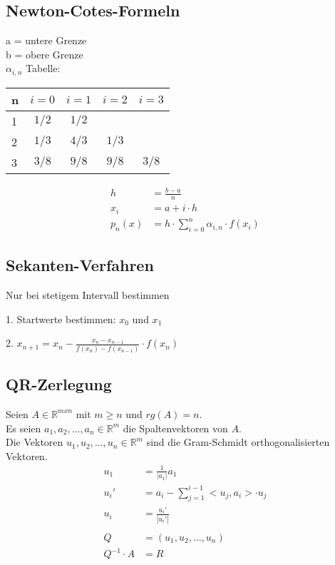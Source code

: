 \documentclass[a4paper, 8pt, landscape]{extarticle}
\let\oldsum\sum
\renewcommand{\sum}{\ensuremath{\textstyle\oldsum}}
\begin{document}
\begin{multicols*}{5}
	    \subsection{Newton-Cotes-Formeln}
   			a = untere Grenze\\
			b = obere Grenze\\
			$\alpha_{i,n}$ Tabelle:\\
			\begin{tabular}{l | c c c c }
				n & $i=0$ & $i=1$ & $i=2$ & $i=3$ \\\hline
				1 & $1/2$ & $1/2$ & & \\
				2 & $1/3$ & $4/3$ & $1/3$ & \\
				3 & $3/8$ & $9/8$ & $9/8$ & $3/8$
			\end{tabular}
			\begin{align*}
		        h &= \frac{b-a}{n}\\
		        x_i &= a+i\cdot h\\
		        p_{n}(x) &= h\cdot \sum_{i=0}^{n}\alpha_{i,n}\cdot f(x_{i})
			\end{align*}
		\subsection{Sekanten-Verfahren}
			Nur bei stetigem Intervall bestimmen\\
			\begin{compactitem}
				\item[1.] Startwerte bestimmen: $x_0$ und $x_1$
				\item[2.] $x_{n+1}=x_{n}-\frac{x_{n}-x_{n-1}}{f(x_{n})-f(x_{n-1})}\cdot f(x_{n})$
			\end{compactitem}
		\subsection{QR-Zerlegung}
			Seien $A \in \mathbb{R}^{mxn}$ mit $m \ge n$ und $rg(A) = n$.\\
			Es seien $a_1, a_2, ..., a_n \in \mathbb{R}^m$ die Spaltenvektoren von $A$. \\
			Die Vektoren $u_1, u_2, ..., u_n \in \mathbb{R}^m$ sind die Gram-Schmidt orthogonalisierten Vektoren. 
			\begin{align*}
				u_1 &= \frac{1}{|a_1|} a_1\\
				u_i' &= a_i - \sum_{j = 1}^{i-1} <u_j, a_i> \cdot u_j\\
				u_i &= \frac{u_i'}{|u_i'|}\\\\	 
				Q &= (u_1, u_2, ..., u_n)\\
				Q^{-1}\cdot A &= R 
			\end{align*}

\end{multicols*}
\end{document}
